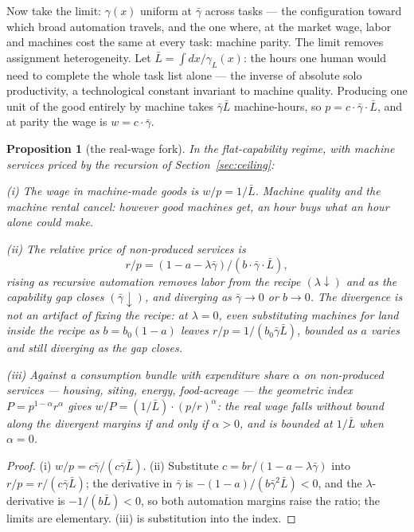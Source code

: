 \documentclass[12pt]{article}
\theoremstyle{plain}
\newtheorem{proposition}{Proposition}
\begin{document}
Now take the limit: $\gamma (x)$ uniform at $\bar{\gamma}$ across tasks --- the configuration toward which broad automation travels, and the one where, at the market wage, labor and machines cost the same at every task: machine parity. The limit removes assignment heterogeneity. Let $\bar{L} = \int dx/\gamma _L(x)$: the hours one human would need to complete the whole task list alone --- the inverse of absolute solo productivity, a technological constant invariant to machine quality. Producing one unit of the good entirely by machine takes $\bar{\gamma}\bar{L}$ machine-hours, so $p = c\cdot \bar{\gamma}\cdot \bar{L}$, and at parity the wage is $w = c\cdot \bar{\gamma}$.

\begin{proposition}[the real-wage fork]\label{prop:fork}
In the flat-capability regime, with machine services priced by the recursion of Section~\ref{sec:ceiling}:

(i) The wage in machine-made goods is $w/p = 1/\bar{L}$. Machine quality and the machine rental cancel: however good machines get, an hour buys what an hour alone could make.

(ii) The relative price of non-produced services is
\begin{equation}\label{eq:fork-price}
r/p = (1 - a - \lambda \bar{\gamma}) / (b\cdot \bar{\gamma}\cdot \bar{L}),
\end{equation}
rising as recursive automation removes labor from the recipe $(\lambda \downarrow )$ and as the capability gap closes $(\bar{\gamma} \downarrow )$, and diverging as $\bar{\gamma} \to 0$ or $b \to 0$. The divergence is not an artifact of fixing the recipe: at $\lambda = 0$, even substituting machines for land inside the recipe as $b = b_0(1-a)$ leaves $r/p = 1/(b_0\bar{\gamma}\bar{L})$, bounded as $a$ varies and still diverging as the gap closes.

(iii) Against a consumption bundle with expenditure share $\alpha$ on non-produced services --- housing, siting, energy, food-acreage --- the geometric index $P = p^{1-\alpha}r^{\alpha}$ gives $w/P = (1/\bar{L})\cdot (p/r)^{\alpha}$: the real wage falls without bound along the divergent margins if and only if $\alpha > 0$, and is bounded at $1/\bar{L}$ when $\alpha = 0$.
\end{proposition}

\begin{proof}
(i) $w/p = c\bar{\gamma}/(c\bar{\gamma}\bar{L})$. (ii) Substitute $c = br/(1-a-\lambda \bar{\gamma})$ into $r/p = r/(c\bar{\gamma}\bar{L})$; the derivative in $\bar{\gamma}$ is $-(1-a)/(b\bar{\gamma}^2\bar{L}) < 0$, and the $\lambda$-derivative is $-1/(b\bar{L}) < 0$, so both automation margins raise the ratio; the limits are elementary. (iii) is substitution into the index.
\end{proof}
\end{document}
